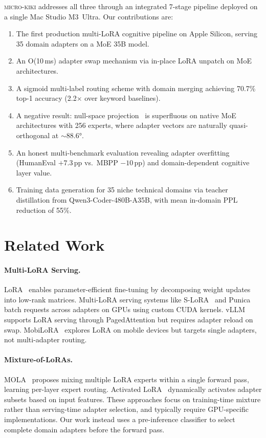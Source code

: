 \documentclass[11pt,a4paper]{article}
\begin{document}
\textsc{micro-kiki} addresses all three through an integrated 7-stage pipeline deployed on a single Mac Studio M3~Ultra. Our contributions are:
\begin{enumerate}[nosep]
  \item The first production multi-LoRA cognitive pipeline on Apple Silicon, serving 35 domain adapters on a MoE 35B model.
  \item An O(10\,ms) adapter swap mechanism via in-place LoRA unpatch on MoE architectures.
  \item A sigmoid multi-label routing scheme with domain merging achieving 70.7\% top-1 accuracy (2.2$\times$ over keyword baselines).
  \item A negative result: null-space projection~\citep{davison2024brainstacks} is superfluous on native MoE architectures with 256 experts, where adapter vectors are naturally quasi-orthogonal at ${\sim}88.6$°.
  \item An honest multi-benchmark evaluation revealing adapter overfitting (HumanEval $+7.3$\,pp vs.\ MBPP $-10$\,pp) and domain-dependent cognitive layer value.
  \item Training data generation for 35 niche technical domains via teacher distillation from Qwen3-Coder-480B-A35B, with mean in-domain PPL reduction of 55\%.
\end{enumerate}

\section{Related Work}
\label{sec:related}

\paragraph{Multi-LoRA Serving.}
LoRA~\citep{hu2022lora} enables parameter-efficient fine-tuning by decomposing weight updates into low-rank matrices. Multi-LoRA serving systems like S-LoRA~\citep{sheng2024slora} and Punica batch requests across adapters on GPUs using custom CUDA kernels. vLLM~\citep{kwon2023efficient} supports LoRA serving through PagedAttention but requires adapter reload on swap. MobiLoRA~\citep{mobilora2025} explores LoRA on mobile devices but targets single adapters, not multi-adapter routing.

\paragraph{Mixture-of-LoRAs.}
MOLA~\citep{gao2024mola} proposes mixing multiple LoRA experts within a single forward pass, learning per-layer expert routing. Activated LoRA~\citep{activatedlora2024} dynamically activates adapter subsets based on input features. These approaches focus on training-time mixture rather than serving-time adapter selection, and typically require GPU-specific implementations. Our work instead uses a pre-inference classifier to select complete domain adapters before the forward pass.
\end{document}
